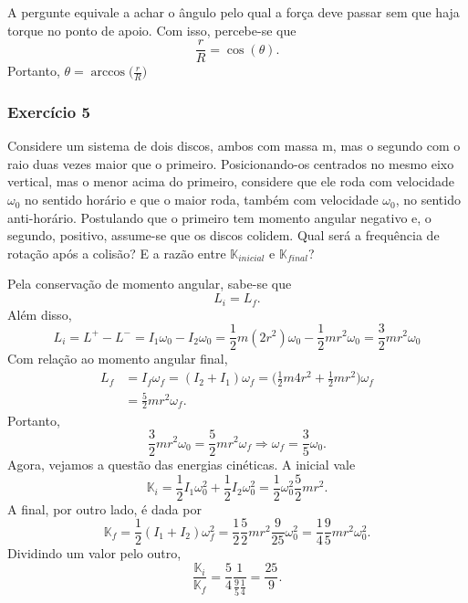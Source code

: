 \documentclass[PhysicsII/physicsII_notes.tex]{subfiles}
\begin{document}
A pergunte equivale a achar o ângulo pelo qual a força deve passar sem que haja torque no ponto de apoio. Com isso, percebe-se que
\[
	\frac{r}{R} = \cos{(\theta )}.
\]
Portanto, \(\theta = \arccos{\biggl(\frac{r}{R}\biggr)}\)
\subsubsection{Exercício 5}
Considere um sistema de dois discos, ambos com massa m, mas o segundo com o raio duas vezes maior que o primeiro. Posicionando-os centrados no mesmo eixo vertical, mas
o menor acima do primeiro, considere que ele roda com velocidade \(\omega_{0}\) no sentido horário e que o maior roda, também com velocidade \(\omega_{0}\), no sentido anti-horário.
Postulando que o primeiro tem momento angular negativo e, o segundo, positivo, assume-se que os discos colidem. Qual será a frequência de rotação após a colisão?
E a razão entre \(\mathbb{K}_{inicial}\) e \(\mathbb{K}_{final}\)?

Pela conservação de momento angular, sabe-se que
\[
	L_{i} = L_{f}.
\]
Além disso,
\[
	L_{i} = L^{+}-L^{-} = I_{1}\omega_{0} - I_{2}\omega_{0} = \frac{1}{2}m(2r^{2})\omega_{0} - \frac{1}{2}mr^{2}\omega_{0} = \frac{3}{2}mr^{2}\omega_{0}
\]
Com relação ao momento angular final,
\begin{align*}
	L_{f} & = I_{f}\omega_{f} = (I_{2} + I_{1})\omega_{f} = \biggl(\frac{1}{2}m4r^{2}+\frac{1}{2}mr^{2}\biggr)\omega_{f} \\
	      & =\frac{5}{2}mr^{2}\omega_{f}.
\end{align*}
Portanto,
\[
	\frac{3}{2}mr^{2}\omega_{0} = \frac{5}{2}mr^{2}\omega_{f} \Rightarrow \omega_{f}=\frac{3}{5}\omega_{0}.
\]
Agora, vejamos a questão das energias cinéticas. A inicial vale
\[
	\mathbb{K}_{i} = \frac{1}{2}I_{1}\omega_{0}^{2} + \frac{1}{2}I_{2}\omega_{0}^{2} = \frac{1}{2}\omega_{0}^{2}\frac{5}{2}mr^{2}.
\]
A final, por outro lado, é dada por
\[
	\mathbb{K}_{f} = \frac{1}{2}(I_{1}+I_{2})\omega_{f}^{2} = \frac{1}{2}\frac{5}{2}mr^{2}\frac{9}{25}\omega_{0}^{2} = \frac{1}{4}\frac{9}{5}mr^{2}\omega_{0}^{2}.
\]
Dividindo um valor pelo outro,
\[
	\frac{\mathbb{K}_{i}}{\mathbb{K}_{f}} = \frac{5}{4}\frac{1}{\frac{9}{5}\frac{1}{4}} = \frac{25}{9}.
\]
\end{document}
